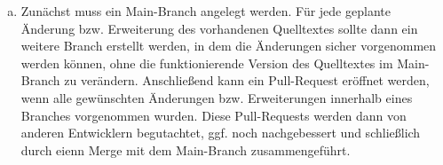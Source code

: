 \begin{enumerate}[(a)]
	\item Zunächst muss ein Main-Branch angelegt werden. Für jede geplante Änderung bzw. Erweiterung des vorhandenen Quelltextes sollte dann ein weitere Branch erstellt werden, in dem die Änderungen sicher vorgenommen werden können, ohne die funktionierende Version des Quelltextes im Main-Branch zu verändern. Anschließend kann ein Pull-Request eröffnet werden, wenn alle gewünschten Änderungen bzw. Erweiterungen innerhalb eines Branches vorgenommen wurden. Diese Pull-Requests werden dann von anderen Entwicklern begutachtet, ggf. noch nachgebessert und schließlich durch eienn Merge mit dem Main-Branch zusammengeführt.
\end{enumerate}

